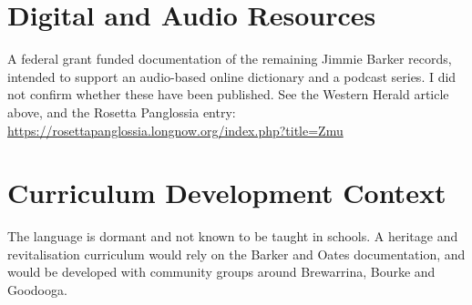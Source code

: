 \documentclass[12pt]{article}
\begin{document}
\section{Digital and Audio Resources}
A federal grant funded documentation of the remaining Jimmie Barker records, intended to support an audio-based online dictionary and a podcast series. I did not confirm whether these have been published. See the Western Herald article above, and the Rosetta Panglossia entry: \url{https://rosettapanglossia.longnow.org/index.php?title=Zmu}

\section{Curriculum Development Context}
The language is dormant and not known to be taught in schools. A heritage and revitalisation curriculum would rely on the Barker and Oates documentation, and would be developed with community groups around Brewarrina, Bourke and Goodooga.
\end{document}
